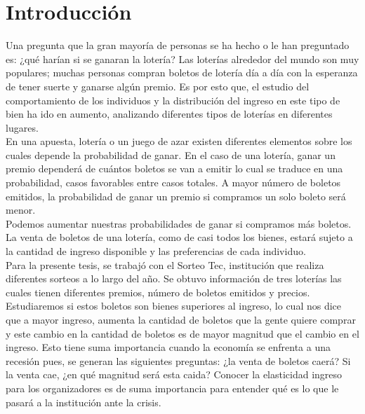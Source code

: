 \chapter*{Introducción}


\noindent Una pregunta que la gran mayoría de personas se ha hecho o le han preguntado es: ¿qué harían si se ganaran la lotería? Las loterías alrededor del mundo son muy populares; muchas personas compran boletos de lotería día a día con la esperanza de tener suerte y ganarse algún premio. Es por esto que, el estudio del comportamiento de los individuos y la distribución del ingreso en este tipo de bien ha ido en aumento, analizando diferentes tipos de loterías en diferentes lugares.  \\

En una apuesta, lotería o un juego de azar existen diferentes elementos sobre los cuales depende la probabilidad de ganar. En el caso de una lotería, ganar un premio dependerá de cuántos boletos se van a emitir lo cual se traduce en una probabilidad, casos favorables entre casos totales. A mayor número de boletos emitidos, la probabilidad de ganar un premio si compramos un solo boleto será menor. \\

Podemos aumentar nuestras probabilidades de ganar si compramos más boletos. La venta de boletos de una lotería, como de casi todos los bienes, estará sujeto a la cantidad de ingreso disponible y las preferencias de cada individuo. \\

Para la presente tesis, se trabajó con el Sorteo Tec, institución que realiza diferentes sorteos a lo largo del año. Se obtuvo información de tres loterías las cuales tienen diferentes premios, número de boletos emitidos y precios. Estudiaremos si estos boletos son bienes superiores al ingreso, lo cual nos dice que a mayor ingreso, aumenta la cantidad de boletos que la gente quiere comprar y este cambio en la cantidad de boletos es de mayor magnitud que el cambio en el ingreso. Esto tiene suma importancia cuando la economía se enfrenta a una recesión pues, se generan las siguientes preguntas: ¿la venta de boletos caerá? Si la venta cae, ¿en qué magnitud será esta caida? Conocer la elasticidad ingreso para los organizadores es de suma importancia para entender qué es lo que le pasará a la institución ante la crisis. \\

